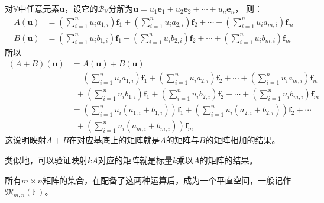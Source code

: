 \documentclass[12pt,UTF8]{ctexbook}
\begin{document}
对$\mathbb{V}$中任意元素$\mathbf{u}$，设它的$\mathcal{B}_\mathbb{V}$分解为$\mathbf{u} = u_1 \mathbf{e}_1 + u_2 \mathbf{e}_2 + \cdots + u_n\mathbf{e}_n$，
则：
\begin{align*}
    A(\mathbf{u}) &= \left(\sum_{i=1}^n u_i a_{1,i}\right) \mathbf{f}_1 + \left(\sum_{i=1}^n u_i a_{2,i}\right) \mathbf{f}_2 + \cdots + \left(\sum_{i=1}^n u_i a_{m,i}\right) \mathbf{f}_m  \\
    B(\mathbf{u}) &= \left(\sum_{i=1}^n u_i b_{1,i}\right) \mathbf{f}_1 + \left(\sum_{i=1}^n u_i b_{2,i}\right) \mathbf{f}_2 + \cdots + \left(\sum_{i=1}^n u_i b_{m,i}\right) \mathbf{f}_m 
\end{align*}
所以
\begin{align*}
    (A+B)(\mathbf{u}) &= A(\mathbf{u}) + B(\mathbf{u})  \\
    &= \left(\sum_{i=1}^n u_i a_{1,i}\right) \mathbf{f}_1 + \left(\sum_{i=1}^n u_i a_{2,i}\right) \mathbf{f}_2 + \cdots + \left(\sum_{i=1}^n u_i a_{m,i}\right) \mathbf{f}_m  \\
    & \,\,\,+ \left(\sum_{i=1}^n u_i b_{1,i}\right) \mathbf{f}_1 + \left(\sum_{i=1}^n u_i b_{2,i}\right) \mathbf{f}_2 + \cdots + \left(\sum_{i=1}^n u_i b_{m,i}\right) \mathbf{f}_m  \\
    &= \left(\sum_{i=1}^n u_i (a_{1,i} + b_{1,i}) \right) \mathbf{f}_1 + \left(\sum_{i=1}^n u_i (a_{2,i} + b_{2,i})\right) \mathbf{f}_2 + \cdots  \\
    & \,\,\,+ \left(\sum_{i=1}^n u_i (a_{m,i} + b_{m,i})\right) \mathbf{f}_m  
\end{align*}
这说明映射$A+B$在对应基底上的矩阵就是$A$的矩阵与$B$的矩阵相加的结果。

类似地，可以验证映射$kA$对应的矩阵就是标量$k$乘以$A$的矩阵的结果。

所有$m\times n$矩阵的集合，在配备了这两种运算后，成为一个平直空间，一般记作$\mathfrak{M}_{m,n}(\mathbb{F})$。
\end{document}
